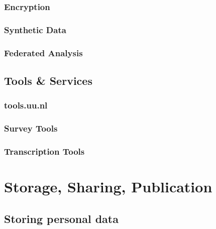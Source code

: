 \documentclass[
]{book}
\begin{document}
\hypertarget{encryption}{%
\section{Encryption}\label{encryption}}

\hypertarget{synthetic-data}{%
\section{Synthetic Data}\label{synthetic-data}}

\hypertarget{federated-analysis}{%
\section{Federated Analysis}\label{federated-analysis}}

\hypertarget{tools-and-services}{%
\chapter{Tools \& Services}\label{tools-and-services}}

\hypertarget{tools.uu.nl}{%
\section{tools.uu.nl}\label{tools.uu.nl}}

\hypertarget{survey-tools}{%
\section{Survey Tools}\label{survey-tools}}

\hypertarget{transcription-tools}{%
\section{Transcription Tools}\label{transcription-tools}}

\hypertarget{part-storage-sharing-publication}{%
\part*{Storage, Sharing, Publication}\label{part-storage-sharing-publication}}

\hypertarget{data-storage}{%
\chapter{Storing personal data}\label{data-storage}}
\end{document}

